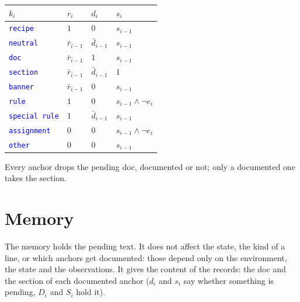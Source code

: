 \documentclass[11pt]{article}
\newcommand{\kind}[1]{\textcolor{blue}{\texttt{#1}}}
\begin{document}
\begin{center}
\begin{tabular}{@{}llll@{}}
  \toprule
  $k_i$ & $r_i$ & $d_i$ & $s_i$ \\
  \midrule
  \kind{recipe} & $1$ & $0$ & $s_{i-1}$ \\
  \kind{neutral} & $\bar r_{i-1}$ & $\bar d_{i-1}$ & $s_{i-1}$ \\
  \kind{doc} & $\bar r_{i-1}$ & $1$ & $s_{i-1}$ \\
  \kind{section} & $\bar r_{i-1}$ & $\bar d_{i-1}$ & $1$ \\
  \kind{banner} & $\bar r_{i-1}$ & $0$ & $s_{i-1}$ \\
  \kind{rule} & $1$ & $0$ & $s_{i-1} \land \lnot e_i$ \\
  \kind{special rule} & $1$ & $\bar d_{i-1}$ & $s_{i-1}$ \\
  \kind{assignment} & $0$ & $0$ & $s_{i-1} \land \lnot e_i$ \\
  \kind{other} & $0$ & $0$ & $s_{i-1}$ \\
  \bottomrule
\end{tabular}
\end{center}

\noindent Every anchor drops the pending doc, documented or not; only a documented one
takes the section.

\section{Memory}
\label{sec:memory}

The memory holds the pending text. It does not affect the state, the kind of a line, or
which anchors get documented: those depend only on the environment, the state and the
observations. It gives the content of the records: the doc and the section of each
documented anchor ($d_i$ and $s_i$ say whether something is pending, $D_i$ and $S_i$ hold
it).
\end{document}
